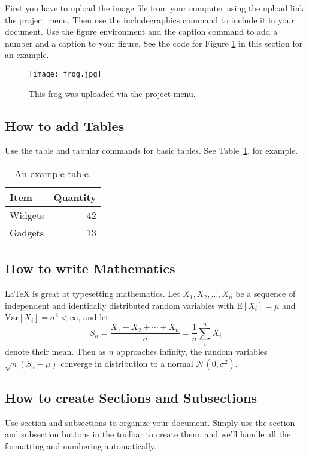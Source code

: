 \documentclass[a4paper]{article}
\begin{document}
First you have to upload the image file from your computer using the upload link the project menu. Then use the includegraphics command to include it in your document. Use the figure environment and the caption command to add a number and a caption to your figure. See the code for Figure \ref{fig:frog} in this section for an example.

\begin{figure}[h]
\centering
\texttt{[image: frog.jpg]}
\caption{\label{fig:frog}This frog was uploaded via the project menu.}
\end{figure}


\subsection{How to add Tables}

Use the table and tabular commands for basic tables. See Table~\ref{tab:widgets}, for example. 

\begin{table}[h]
\centering
\begin{tabular}{l|r}
Item & Quantity \\\hline
Widgets & 42 \\
Gadgets & 13
\end{tabular}
\caption{\label{tab:widgets}An example table.}
\end{table}

\subsection{How to write Mathematics}

\LaTeX{} is great at typesetting mathematics. Let $X_1, X_2, \ldots, X_n$ be a sequence of independent and identically distributed random variables with $\text{E}[X_i] = \mu$ and $\text{Var}[X_i] = \sigma^2 < \infty$, and let
\[S_n = \frac{X_1 + X_2 + \cdots + X_n}{n}
      = \frac{1}{n}\sum_{i}^{n} X_i\]
denote their mean. Then as $n$ approaches infinity, the random variables $\sqrt{n}(S_n - \mu)$ converge in distribution to a normal $\mathcal{N}(0, \sigma^2)$.


\subsection{How to create Sections and Subsections}

Use section and subsections to organize your document. Simply use the section and subsection buttons in the toolbar to create them, and we'll handle all the formatting and numbering automatically.
\end{document}
